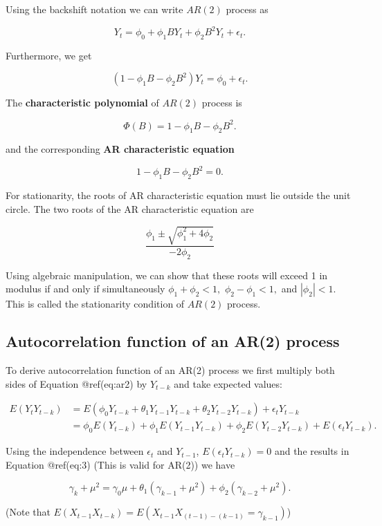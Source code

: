 \documentclass[
  11pt,
  a4paper,
]{report}
\begin{document}
Using the backshift notation we can write \(AR(2)\) process as

\[Y_t = \phi_0 + \phi_1 BY_{t} + \phi_2 B^2 Y_{t} + \epsilon_t.\]

Furthermore, we get

\[(1-\phi_1 B - \phi_2 B^2) Y_t = \phi_0 + \epsilon_t.\]

The \textbf{characteristic polynomial} of \(AR(2)\) process is

\[\Phi(B)=1-\phi_1 B - \phi_2 B^2.\]

and the corresponding \textbf{AR characteristic equation}

\[1-\phi_1 B - \phi_2 B^2=0.\]

For stationarity, the roots of AR characteristic equation must lie
outside the unit circle. The two roots of the AR characteristic equation
are

\[\frac{\phi_1 \pm \sqrt{\phi_1^2 + 4\phi_2}}{-2\phi_2}\]

Using algebraic manipulation, we can show that these roots will exceed 1
in modulus if and only if simultaneously \(\phi_1 + \phi_2 < 1,\)
\(\phi_2-\phi_1 < 1,\) and \(|\phi_2| < 1.\) This is called the
stationarity condition of \(AR(2)\) process.

\subsection{Autocorrelation function of an AR(2)
process}\label{autocorrelation-function-of-an-ar2-process}

To derive autocorrelation function of an AR(2) process we first multiply
both sides of Equation @ref(eq:ar2) by \(Y_{t-k}\) and take expected
values:

\begin{align}
E(Y_tY_{t-k}) &= E(\phi_0Y_{t-k}+\theta_1Y_{t-1}Y_{t-k}+\theta_2Y_{t-2}Y_{t-k})+\epsilon_tY_{t-k} \\
&= \phi_0 E(Y_{t-k})+\phi_{1}E(Y_{t-1}Y_{t-k}) + \phi_2 E(Y_{t-2} Y_{t-k}) + E(\epsilon_tY_{t-k}).
\end{align}

Using the independence between \(\epsilon_t\) and \(Y_{t-1}\),
\(E(\epsilon_t Y_{t-k})=0\) and the results in Equation @ref(eq:3) (This
is valid for AR(2)) we have

\[\gamma_k + \mu^2 = \gamma_0 \mu + \theta_1 (\gamma_{k-1}+\mu^2)+\phi_2 (\gamma_{k-2}+\mu^2).\]

(Note that \(E(X_{t-1}X_{t-k})=E(X_{t-1}X_{(t-1)-(k-1)}=\gamma_{k-1})\))
\end{document}
